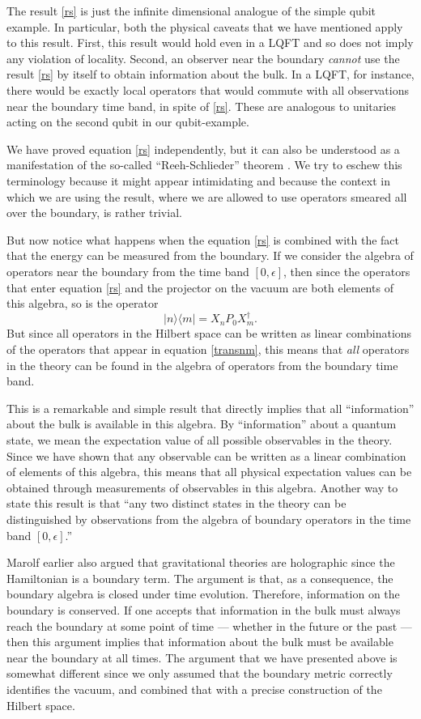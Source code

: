 \documentclass[12pt]{article}
\newcommand{\be}{\begin{equation}}
\newcommand{\ee}{\end{equation}}
\def\projvac{{\cal P}_{\Omega}}
\def\projvac{P_0}
\begin{document}
The result \eqref{rs} is just the infinite dimensional analogue of the simple qubit example. In particular, both the physical caveats that we have mentioned apply to this result. First, this result would hold even in a LQFT and so does not imply any violation of locality. Second, an observer near the boundary {\em cannot} use the result \eqref{rs} by itself to obtain information about the bulk. In a LQFT, for instance, there would be exactly local operators that would commute with all observations near the boundary time band, in spite of \eqref{rs}.  These are analogous to unitaries acting on the second qubit in our qubit-example.

We have proved equation \eqref{rs} independently, but it can also be understood as a manifestation of the so-called ``Reeh-Schlieder'' theorem \cite{Haag:1992hx}. We try to eschew this terminology because it might appear intimidating and  because the context in which we are using the result, where we are allowed to use operators smeared all over the boundary, is rather trivial.


But now notice what happens when the equation \eqref{rs} is combined with the fact that the energy can be measured from the boundary. If we consider the algebra of operators near the boundary from the time band $[0, \epsilon]$, then since the operators that enter equation \eqref{rs} and the projector on the vacuum are both elements of this algebra, so is the operator
\be
\label{transnm}
|n \rangle \langle m| = X_n \projvac X_m^{\dagger}.
\ee
But since all operators in the Hilbert space can be written as linear combinations of the operators that appear in equation \eqref{transnm}, this means that {\em all} operators in the theory can be found in the algebra of operators from the boundary time band.

This is a remarkable and simple result
that  directly implies that all ``information'' about the bulk is available in this algebra. By ``information'' about a quantum state, we mean the expectation value of all possible observables in the theory. Since we have shown that  any observable can be written as a linear combination of elements of this algebra, this means that all physical expectation values can be
obtained through measurements of observables in this algebra. Another way to state this result is that ``any two distinct states in the theory can be distinguished by observations from the algebra of boundary operators in the time band $[0, \epsilon]$.''

Marolf earlier also argued \cite{Marolf:2008mf,Marolf:2006bk,Marolf:2013iba} that gravitational theories are holographic since the Hamiltonian is a boundary term. The  argument is that, as a consequence, the boundary algebra is closed under time evolution.  Therefore, information on the boundary is conserved. If one accepts that information in the bulk must always reach the boundary at some point of time --- whether in the future or the past --- then this argument implies that information about the bulk must be available near the boundary at all times. The argument that we have presented above is somewhat different since we only assumed that the boundary metric correctly identifies the vacuum, and combined that with a precise construction of the Hilbert space.
\end{document}
